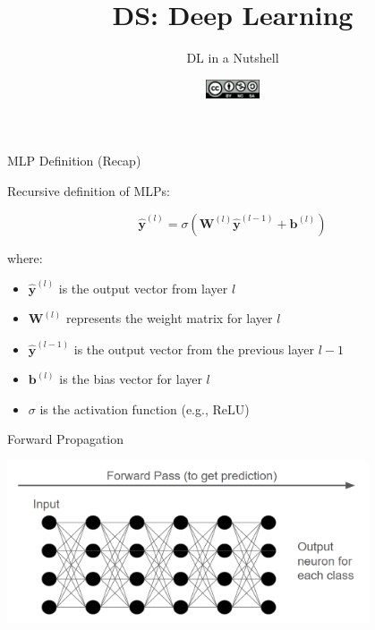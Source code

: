 \documentclass[aspectratio=169]{../latex_main/tntbeamer}  %
\title[DL in a Nutshell]{DS: Deep Learning}
\subtitle{DL in a Nutshell}
\date{\hspace{0.5em} {\includegraphics[height=1.5em]{../latex_main/figures/Cc-by-nc-sa_icon.svg.png}}}
\begin{document}
	
	\maketitle
	\begin{frame}{MLP Definition (Recap)}

        Recursive definition of MLPs:

            \[
            \hat{\textbf{y}}^{(l)} = \sigma(\textbf{W}^{(l)} \hat{\textbf{y}}^{(l-1)} + \textbf{b}^{(l)})
            \]
            
            where:
            \begin{itemize}
                \item \( \hat{\textbf{y}}^{(l)} \) is the output vector from layer \( l \)
                \item \( \textbf{W}^{(l)} \) represents the weight matrix for layer \( l \)
                \item \( \hat{\textbf{y}}^{(l-1)} \) is the output vector from the previous layer \( l-1 \)
                \item \( \textbf{b}^{(l)} \) is the bias vector for layer \( l \)
                \item \( \sigma \) is the activation function (e.g., ReLU)
            \end{itemize}
                
	\end{frame}


  	\begin{frame}{Forward Propagation}

        \includegraphics[width=0.8\textwidth]{figures/forward.png}

        \end{frame}
\end{document}

